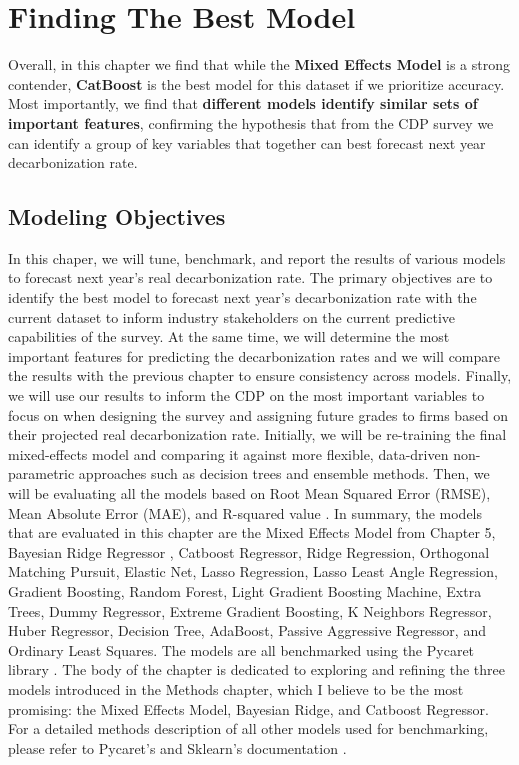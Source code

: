 \chapter{Finding The Best Model}
\label{ch:finding-the-best-model}

\begin{keytakeaway}
    Overall, in this chapter we find that while the \textbf{Mixed Effects Model} is a strong contender, \textbf{CatBoost} is the best model for this dataset if we prioritize accuracy. Most importantly, we find that \textbf{different models identify similar sets of important features}, confirming the hypothesis that from the CDP survey we can identify a group of key variables that together can best forecast next year decarbonization rate.
\end{keytakeaway}



\section{Modeling Objectives}
In this chaper, we will tune, benchmark, and report the results of various models to forecast next year's real decarbonization rate. The primary objectives are to identify the best model to forecast next year's decarbonization rate with the current dataset to inform industry stakeholders on the current predictive capabilities of the survey. At the same time, we will determine the most important features for predicting the decarbonization rates and we will compare the results with the previous chapter to ensure consistency across models. Finally, we will use our results to inform the CDP on the most important variables to focus on when designing the survey and assigning future grades to firms based on their projected real decarbonization rate. Initially, we will be re-training the final mixed-effects model and comparing it against more flexible, data-driven non-parametric approaches such as decision trees and ensemble methods. Then, we will be evaluating all the models based on Root Mean Squared Error (RMSE), Mean Absolute Error (MAE), and R-squared value \cite{gmd}. In summary, the models that are evaluated in this chapter are the Mixed Effects Model from Chapter 5, Bayesian Ridge Regressor , Catboost Regressor, Ridge Regression, Orthogonal Matching Pursuit, Elastic Net, Lasso Regression, Lasso Least Angle Regression, Gradient Boosting, Random Forest, Light Gradient Boosting Machine, Extra Trees, Dummy Regressor, Extreme Gradient Boosting, K Neighbors Regressor, Huber Regressor, Decision Tree, AdaBoost, Passive Aggressive Regressor, and Ordinary Least Squares. The models are all benchmarked using the Pycaret library \cite{pycaret}. The body of the chapter is dedicated to  exploring and refining the three models introduced in the Methods chapter, which I believe to be the most promising: the Mixed Effects Model, Bayesian Ridge, and Catboost Regressor. For a detailed methods description of all other models used for benchmarking, please refer to Pycaret's and Sklearn's documentation \cite{pycaret,scikit-learn}.


